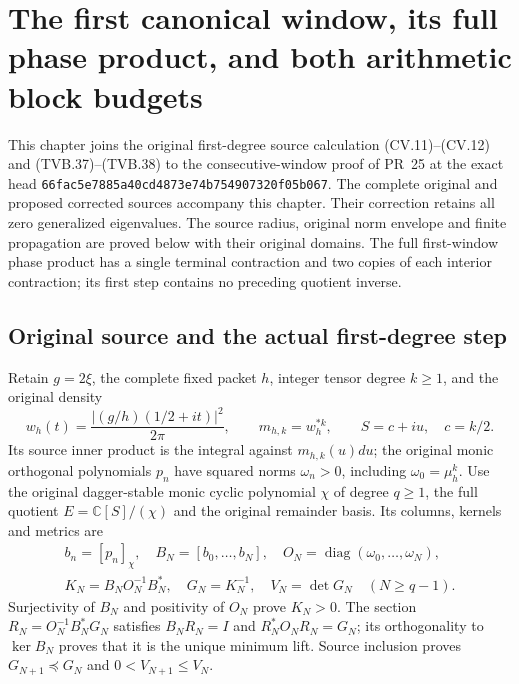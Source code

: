\begingroup
\def\C{\mathbb{C}}
\def\R{\mathbb{R}}
\def\Tr{\operatorname{Tr}}
\section{The first canonical window, its full phase product, and both arithmetic block budgets}



This chapter joins the original first-degree source calculation
(CV.11)--(CV.12) and (TVB.37)--(TVB.38) to the consecutive-window
proof of PR~25 at the exact head
\texttt{66fac5e7885a40cd4873}\allowbreak\texttt{e74b754907320f05b067}.
The complete original and proposed corrected sources accompany this
chapter. Their correction retains all zero generalized eigenvalues.
The source radius, original norm envelope and finite propagation
are proved below with their original domains. The full first-window
phase product has a single terminal contraction and two copies of
each interior contraction; its first step contains no preceding
quotient inverse.

\subsection{Original source and the actual first-degree step}

Retain $g=2\xi$, the complete fixed packet $h$, integer tensor degree $k\ge1$,
and the original density
\[
 w_h(t)=\frac{|(g/h)(1/2+it)|^2}{2\pi},\qquad
 m_{h,k}=w_h^{*k},\qquad S=c+iu,\quad c=k/2.
 \tag{CJ.1}
\]
Its source inner product is the integral against $m_{h,k}(u)du$;
the original monic orthogonal polynomials $p_n$ have squared norms
$\omega_n>0$, including $\omega_0=\mu_h^k$.
Use the original dagger-stable monic cyclic polynomial $\chi$ of
degree $q\ge1$, the full quotient $E=\C[S]/(\chi)$ and the
original remainder basis. Its columns, kernels and metrics are
\[
 \begin{gathered}
 b_n=[p_n]_\chi,\quad B_N=[b_0,\ldots,b_N],\quad
 O_N=\operatorname{diag}(\omega_0,\ldots,\omega_N),\quad
 \\
 K_N=B_NO_N^{-1}B_N^*,\quad G_N=K_N^{-1},\quad V_N=\det G_N
 \quad(N\ge q-1).
 \end{gathered}
 \tag{CJ.2}
\]
Surjectivity of $B_N$ and positivity of $O_N$ prove $K_N>0$.
The section $R_N=O_N^{-1}B_N^*G_N$ satisfies $B_NR_N=I$ and
$R_N^*O_NR_N=G_N$; its orthogonality to $\ker B_N$ proves
that it is the unique minimum lift. Source inclusion proves
$G_{N+1}\preceq G_N$ and $0<V_{N+1}\le V_N$.


